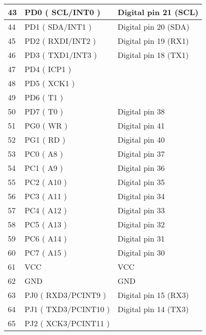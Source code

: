 \begin{longtable}[c]{|l|l|l|}
    43         & PD0 ( SCL/INT0 )         & Digital pin 21 (SCL)  \\ \hline
    44         & PD1 ( SDA/INT1 )         & Digital pin 20 (SDA)  \\ \hline
    45         & PD2 ( RXDI/INT2 )        & Digital pin 19 (RX1)  \\ \hline
    46         & PD3 ( TXD1/INT3 )        & Digital pin 18 (TX1)  \\ \hline
    47         & PD4 ( ICP1 )             &                       \\ \hline
    48         & PD5 ( XCK1 )             &                       \\ \hline
    49         & PD6 ( T1 )               &                       \\ \hline
    50         & PD7 ( T0 )               & Digital pin 38        \\ \hline
    51         & PG0 ( WR )               & Digital pin 41        \\ \hline
    52         & PG1 ( RD )               & Digital pin 40        \\ \hline
    53         & PC0 ( A8 )               & Digital pin 37        \\ \hline
    54         & PC1 ( A9 )               & Digital pin 36        \\ \hline
    55         & PC2 ( A10 )              & Digital pin 35        \\ \hline
    56         & PC3 ( A11 )              & Digital pin 34        \\ \hline
    57         & PC4 ( A12 )              & Digital pin 33        \\ \hline
    58         & PC5 ( A13 )              & Digital pin 32        \\ \hline
    59         & PC6 ( A14 )              & Digital pin 31        \\ \hline
    60         & PC7 ( A15 )              & Digital pin 30        \\ \hline
    61         & VCC                      & VCC                   \\ \hline
    62         & GND                      & GND                   \\ \hline
    63         & PJ0 ( RXD3/PCINT9 )      & Digital pin 15 (RX3)  \\ \hline
    64         & PJ1 ( TXD3/PCINT10 )     & Digital pin 14 (TX3)  \\ \hline
    65         & PJ2 ( XCK3/PCINT11 )     &                       \\ \hline

\end{longtable}
